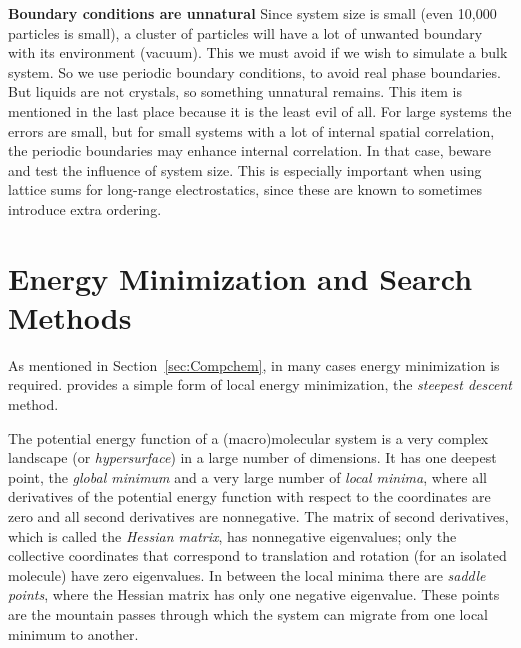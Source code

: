 {\bf Boundary conditions are unnatural}
Since system size is small (even 10,000 particles is small), a cluster
of particles will have a lot of unwanted boundary with its environment
(vacuum). This we must avoid if we wish to simulate a bulk system. So
we use periodic boundary conditions, to avoid real phase
boundaries. But liquids are not crystals, so something unnatural
remains. This item is mentioned in the last place because it is the
least evil of all. For large systems the errors are small, but for
small systems with a lot of internal spatial correlation, the periodic
boundaries may enhance internal correlation. In that case, beware and
test the influence of system size. This is especially important when
using lattice sums for long-range electrostatics, since these are known
to sometimes introduce extra ordering.

\section{Energy Minimization and Search Methods}

As mentioned in Section~\ref{sec:Compchem}, in many cases energy
minimization is required. {\gromacs} provides a simple form of local
energy minimization, the {\em steepest descent} method.

The potential energy function of a (macro)molecular system is a very
complex landscape (or {\em hypersurface}) in a large number of
dimensions. It has one deepest point, the {\em global minimum} and a
very large number of {\em local minima}, where all derivatives of the
potential energy function with respect to the coordinates are zero and
all second derivatives are nonnegative. The matrix of second
derivatives, which is called the {\em Hessian matrix}, has nonnegative
eigenvalues; only the collective coordinates that correspond to
translation and rotation (for an isolated molecule) have zero
eigenvalues. In between the local minima there are {\em saddle
points}, where the Hessian matrix has only one negative
eigenvalue. These points are the mountain passes through which the
system can migrate from one local minimum to another.

